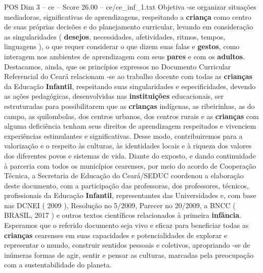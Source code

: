 \begin{textsample}{POS Dim 3 – ce – Score 26.00 – ce/ce\_inf\_1.txt}
Objetiva -se organizar situações mediadoras, significativas de aprendizagens, respeitando a \textbf{criança} como centro de suas próprias decisões e do planejamento curricular, levando em consideração as singularidades ( \textbf{desejos}, necessidades, afetividades, ritmos, tempos, linguagens ), o que requer considerar o que dizem suas falas e \textbf{gestos}, como interagem nos ambientes de aprendizagem com seus \textbf{pares} e com os \textbf{adultos}.
Destacamos, ainda, que os princípios expressos no Documento Curricular Referencial do Ceará relacionam -se ao trabalho docente com todas as \textbf{crianças} da Educação \textbf{Infantil}, respeitando suas singularidades e especificidades, devendo as ações pedagógicas, desenvolvidas nas \textbf{instituições} educacionais, ser estruturadas para possibilitarem que as \textbf{crianças} indígenas, as ribeirinhas, as do campo, as quilombolas, dos centros urbanos, dos centros rurais e as \textbf{crianças} com alguma deficiência tenham seus direitos de aprendizagem respeitados e vivenciem experiências estimulantes e significativas.
Desse modo, contribuiremos para a valorização e o respeito às culturas, às identidades locais e à riqueza dos valores dos diferentes povos e sistemas de vida.
Diante do exposto, e dando continuidade à parceria com todos os municípios cearenses, por meio do acordo de Cooperação Técnica, a Secretaria de Educação do Ceará/SEDUC coordenou a elaboração deste documento, com a participação das professoras, dos professores, técnicos, profissionais da Educação \textbf{Infantil}, representantes das Universidades e, com base nas DCNEI ( 2009 ), Resolução no 5/2009, Parecer no 20/2009, a BNCC ( BRASIL, 2017 ) e outros textos científicos relacionados à primeira \textbf{infância}.
Esperamos que o referido documento seja vivo e eficaz para beneficiar todas as \textbf{crianças} cearenses em suas capacidades e potencialidades de explorar e representar o mundo, construir sentidos pessoais e coletivos, apropriando -se de inúmeras formas de agir, sentir e pensar as culturas, marcadas pela preocupação com a sustentabilidade do planeta.

\end{textsample}
